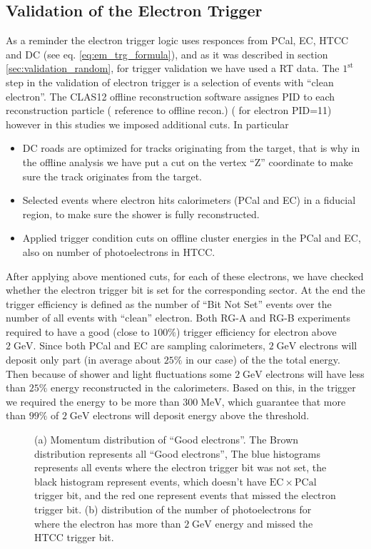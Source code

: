 \subsection{Validation of the Electron Trigger}
As a reminder the electron trigger logic uses responces from PCal, EC, HTCC and DC (see eq. \ref{eq:em_trg_formula}), and as it was described in section \ref{sec:validation_random}, for trigger validation we have used a RT data. 
The $\mathrm{1^{st}}$ step in the validation of electron trigger is a selection of  events with ``clean electron''. The CLAS12 offline reconstruction software assignes PID to each reconstruction particle ({\color{Red} reference to offline recon.}) ( for electron PID=11) however in this studies we imposed additional cuts. 
In particular 
\begin{itemize}
 \item DC roads are optimized for tracks originating from the target, that is why in the offline analysis we have put a cut on the vertex ``Z'' coordinate to make sure the track originates from the target.
 \item Selected events where electron hits calorimeters (PCal and EC) in a fiducial region, to make sure the shower is fully reconstructed.
 \item Applied trigger condition cuts on offline cluster energies in the PCal and EC, also on number of photoelectrons in HTCC.
\end{itemize}
After applying above mentioned cuts, for each of these electrons, we have checked whether the electron trigger bit is set for the corresponding sector. At the end the trigger efficiency is defined as the number of ``Bit Not Set'' events over the number of all events with ``clean'' electron.
Both RG-A and RG-B experiments required to have a good (close to $100 \%$) trigger efficiency for electron above $\mathrm{2\;GeV}$. Since both PCal and EC are sampling calorimeters, $\mathrm{2\;GeV}$ electrons will deposit only part (in average about $25\%$ in our case) of the the total energy. Then because of shower and light fluctuations some $\mathrm{2\;GeV}$ electrons will have less than $\mathrm{25\%}$ energy reconstructed in the calorimeters. Based on this, in the trigger we required the energy to be more than $\mathrm{300 \; MeV}$, which guarantee that more than $\mathrm{99\%}$ of $\mathrm{2\;GeV}$ electrons will deposit energy above the threshold.
\begin{figure}[!htb]
 \centering
 \caption{(a) Momentum distribution of ``Good electrons''. The Brown distribution represents all ``Good electrons'', The blue histograms represents all events where the electron trigger bit was not set, the black histogram represent events, which doesn't have $\mathrm{EC}\times \mathrm{PCal}$ trigger bit, and the red one represent events that missed the electron trigger bit. (b) distribution of the number of photoelectrons for where the electron has more than $\mathrm{2\;GeV}$ energy and missed the HTCC trigger bit.}
 \label{fig:em_missed_events}
\end{figure}
